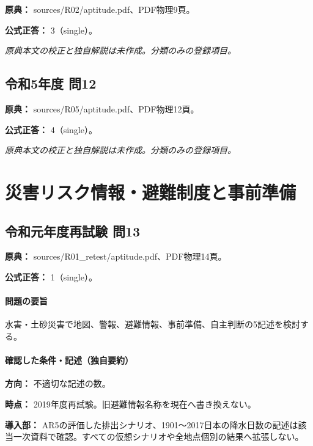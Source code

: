 \noindent\textbf{原典：} sources/R02/aptitude.pdf、PDF物理9頁。

\textbf{公式正答：} 3（single）。

\par\textit{原典本文の校正と独自解説は未作成。分類のみの登録項目。}

\subsection{令和5年度 問12}
\label{q:r05-reg-apt-12}

\noindent\textbf{原典：} sources/R05/aptitude.pdf、PDF物理12頁。

\textbf{公式正答：} 4（single）。

\par\textit{原典本文の校正と独自解説は未作成。分類のみの登録項目。}

\section{災害リスク情報・避難制度と事前準備}

\subsection{令和元年度再試験 問13}
\label{q:r01-ret-apt-13}

\noindent\textbf{原典：} sources/R01\_retest/aptitude.pdf、PDF物理14頁。

\textbf{公式正答：} 1（single）。

\paragraph{問題の要旨} 水害・土砂災害で地図、警報、避難情報、事前準備、自主判断の5記述を検討する。

\paragraph{確認した条件・記述（独自要約）}\mbox{}\par

\noindent\textbf{方向：} 不適切な記述の数。\par

\noindent\textbf{時点：} 2019年度再試験。旧避難情報名称を現在へ書き換えない。\par

\noindent\textbf{導入部：} AR5の評価した排出シナリオ、1901〜2017日本の降水日数の記述は該当一次資料で確認。すべての仮想シナリオや全地点個別の結果へ拡張しない。\par

